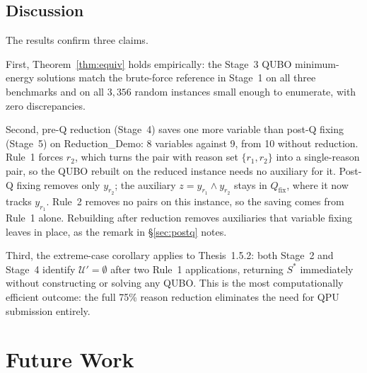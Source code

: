 \documentclass[11pt,a4paper]{article}
\theoremstyle{plain}
\theoremstyle{definition}
\theoremstyle{remark}
\newcommand{\U}{\mathcal{U}}
\newcommand{\Sstar}{S^{*}}
\newcommand{\QUBO}{\textup{QUBO}}
\newcommand{\set}[1]{\{#1\}}
\begin{document}
\subsection{Discussion}

The results confirm three claims.

First, Theorem~\ref{thm:equiv} holds empirically: the Stage~3 \QUBO{}
minimum-energy solutions match the brute-force reference in Stage~1 on all three
benchmarks and on all $3{,}356$ random instances small enough to enumerate, with
zero discrepancies.

Second, pre-Q reduction (Stage~4) saves one more variable than post-Q fixing
(Stage~5) on Reduction\_Demo: 8 variables against 9, from 10 without reduction.
Rule~1 forces $r_2$, which turns the pair with reason set $\set{r_1, r_2}$ into a
single-reason pair, so the \QUBO{} rebuilt on the reduced instance needs no
auxiliary for it.
Post-Q fixing removes only $y_{r_2}$; the auxiliary $z = y_{r_1} \wedge y_{r_2}$
stays in $Q_{\text{fix}}$, where it now tracks $y_{r_1}$.
Rule~2 removes no pairs on this instance, so the saving comes from Rule~1 alone.
Rebuilding after reduction removes auxiliaries that variable fixing leaves in
place, as the remark in \S\ref{sec:postq} notes.

Third, the extreme-case corollary applies to Thesis~1.5.2: both Stage~2 and
Stage~4 identify $\U' = \emptyset$ after two Rule~1 applications, returning
$\Sstar$ immediately without constructing or solving any \QUBO{}.
This is the most computationally efficient outcome: the full 75\% reason reduction
eliminates the need for QPU submission entirely.

\section{Future Work}
\label{sec:future}
\end{document}
